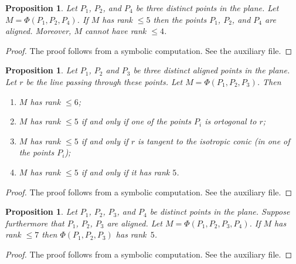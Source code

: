 \documentclass[12pt, a4paper, reqno, captions=tableheading,bibliography=totoc]{scrartcl}
\theoremstyle{plain}
\newtheorem{prop}[lemma]{Proposition}
\theoremstyle{definition}
\begin{document}
\begin{prop}
\label{prop:condition_rank_aligned}
 Let $P_1$, $P_2$, and $P_4$ be three distinct points in the plane.
 Let $M = \Phi(P_1, P_2, P_4)$.
 If $M$ has rank $\leq 5$ then the points $P_1$, $P_2$, and $P_4$ are aligned.
 Moreover, $M$ cannot have rank $\leq 4$.
\end{prop}
\begin{proof}
 The proof follows from a symbolic computation. See the auxiliary file.
\end{proof}

\begin{prop}
  \label{prop:rank3points}
  Let $P_1$, $P_2$ and $P_3$ be three distinct aligned points in the plane.
  Let $r$ be the line passing through these points.
  Let $M = \Phi(P_1, P_2, P_3)$.
  Then
  \begin{enumerate}
  \item $M$ has rank $\leq 6$;
  \item $M$ has rank $\leq 5$ if and only if one of the points $P_i$ is
    ortogonal to $r$;
  \item $M$ has rank $\leq 5$ if and only if $r$ is tangent to the
    isotropic conic (in one of the points $P_i$);
  \item $M$ has rank $\leq 5$ if and only if it has rank $5$.
  \end{enumerate}
\end{prop}
\begin{proof}
The proof follows from a symbolic computation. See the auxiliary file.
\end{proof}

\begin{prop}
\label{prop:condition_rank_aligned3}
 Let $P_1$, $P_2$, $P_3$, and $P_4$ be distinct points in the plane.
 Suppose furthermore that $P_1$, $P_2$, $P_3$ are aligned.
 Let $M = \Phi(P_1, P_2, P_3, P_4)$.
 If $M$ has rank $\leq 7$ then $\Phi(P_1, P_2, P_3)$ has rank~$5$.
\end{prop}
\begin{proof}
 The proof follows from a symbolic computation. See the auxiliary file.
\end{proof}
\end{document}
